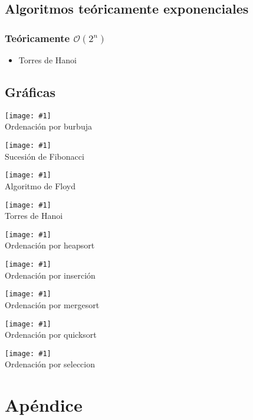 \documentclass[a4paper, 11pt]{article} %
\newcommand{\imagen}[2]{\begin{center} \texttt{[image: \#1]} \\#2 \end{center}}
\begin{document}
    \noindent{}

\subsection{Algoritmos teóricamente exponenciales}
  \subsubsection{Teóricamente $\mathcal{O}(2^n)$}
  \begin{itemize}
   \item Torres de Hanoi\\
   
   
  \end{itemize}

\subsection {Gráficas}
\imagen{../regressionPlots/burbuja_fit.jpg}{Ordenación por burbuja}

\imagen{../regressionPlots/fibonacci_fit.jpg}{Sucesión de Fibonacci}

\imagen{../regressionPlots/floyd_fit.jpg}{Algoritmo de Floyd}

\imagen{../regressionPlots/hanoi_fit.jpg}{Torres de Hanoi}

\imagen{../regressionPlots/heapsort_fit.jpg}{Ordenación por heapsort}

\imagen{../regressionPlots/insercion_fit.jpg}{Ordenación por inserción}

\imagen{../regressionPlots/mergesort_fit.jpg}{Ordenación por mergesort}

\imagen{../regressionPlots/quicksort_fit.jpg}{Ordenación por quicksort}

\imagen{../regressionPlots/seleccion_fit.jpg}{Ordenación por seleccion}

\newpage
\section{Apéndice}
\end{document}
